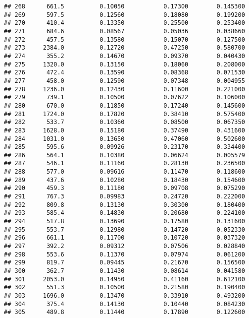 \documentclass[
]{article}
\begin{document}
\begin{verbatim}
## 268      661.5          0.10050           0.17300        0.145300
## 269      597.5          0.12560           0.18080        0.199200
## 270      410.4          0.13350           0.25500        0.253400
## 271      684.6          0.08567           0.05036        0.038660
## 272      457.5          0.13580           0.15070        0.127500
## 273     2384.0          0.12720           0.47250        0.580700
## 274      355.2          0.14670           0.09370        0.040430
## 275     1320.0          0.13150           0.18060        0.208000
## 276      472.4          0.13590           0.08368        0.071530
## 277      458.0          0.12590           0.07348        0.004955
## 278     1236.0          0.12430           0.11600        0.221000
## 279      739.1          0.10500           0.07622        0.106000
## 280      670.0          0.11850           0.17240        0.145600
## 281     1724.0          0.17820           0.38410        0.575400
## 282      533.7          0.10360           0.08500        0.067350
## 283     1628.0          0.15180           0.37490        0.431600
## 284     1031.0          0.13650           0.47060        0.502600
## 285      595.6          0.09926           0.23170        0.334400
## 286      564.1          0.10380           0.06624        0.005579
## 287      546.1          0.11160           0.28130        0.236500
## 288      577.0          0.09616           0.11470        0.118600
## 289      437.6          0.10280           0.18430        0.154600
## 290      459.3          0.11180           0.09708        0.075290
## 291      767.3          0.09983           0.24720        0.222000
## 292      809.8          0.13130           0.30300        0.180400
## 293      585.4          0.14830           0.20680        0.224100
## 294      517.8          0.13690           0.17580        0.131600
## 295      553.7          0.12980           0.14720        0.052330
## 296      661.1          0.11700           0.10720        0.037320
## 297      392.2          0.09312           0.07506        0.028840
## 298      553.6          0.11370           0.07974        0.061200
## 299      819.7          0.09445           0.21670        0.156500
## 300      362.7          0.11430           0.08614        0.041580
## 301     2053.0          0.14950           0.41160        0.612100
## 302      551.3          0.10500           0.21580        0.190400
## 303     1696.0          0.13470           0.33910        0.493200
## 304      375.4          0.14130           0.10440        0.084230
## 305      489.8          0.11440           0.17890        0.122600

\end{verbatim}
\end{document}
